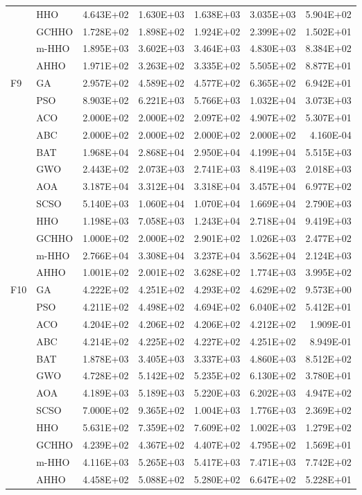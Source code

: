 \begin{longtable}{llrrrrr}
 & HHO & 4.643E+02 & 1.630E+03 & 1.638E+03 & 3.035E+03 & 5.904E+02 \\
 & GCHHO & 1.728E+02 & 1.898E+02 & 1.924E+02 & 2.399E+02 & 1.502E+01 \\
 & m-HHO & 1.895E+03 & 3.602E+03 & 3.464E+03 & 4.830E+03 & 8.384E+02 \\
 & AHHO & 1.971E+02 & 3.263E+02 & 3.335E+02 & 5.505E+02 & 8.877E+01 \\
\addlinespace
F9 & GA & 2.957E+02 & 4.589E+02 & 4.577E+02 & 6.365E+02 & 6.942E+01 \\
 & PSO & 8.903E+02 & 6.221E+03 & 5.766E+03 & 1.032E+04 & 3.073E+03 \\
 & ACO & 2.000E+02 & 2.000E+02 & 2.097E+02 & 4.907E+02 & 5.307E+01 \\
 & ABC & 2.000E+02 & 2.000E+02 & 2.000E+02 & 2.000E+02 & 4.160E-04 \\
 & BAT & 1.968E+04 & 2.868E+04 & 2.950E+04 & 4.199E+04 & 5.515E+03 \\
 & GWO & 2.443E+02 & 2.073E+03 & 2.741E+03 & 8.419E+03 & 2.018E+03 \\
 & AOA & 3.187E+04 & 3.312E+04 & 3.318E+04 & 3.457E+04 & 6.977E+02 \\
 & SCSO & 5.140E+03 & 1.060E+04 & 1.070E+04 & 1.669E+04 & 2.790E+03 \\
 & HHO & 1.198E+03 & 7.058E+03 & 1.243E+04 & 2.718E+04 & 9.419E+03 \\
 & GCHHO & 1.000E+02 & 2.000E+02 & 2.901E+02 & 1.026E+03 & 2.477E+02 \\
 & m-HHO & 2.766E+04 & 3.308E+04 & 3.237E+04 & 3.562E+04 & 2.124E+03 \\
 & AHHO & 1.001E+02 & 2.001E+02 & 3.628E+02 & 1.774E+03 & 3.995E+02 \\
\addlinespace
F10 & GA & 4.222E+02 & 4.251E+02 & 4.293E+02 & 4.629E+02 & 9.573E+00 \\
 & PSO & 4.211E+02 & 4.498E+02 & 4.694E+02 & 6.040E+02 & 5.412E+01 \\
 & ACO & 4.204E+02 & 4.206E+02 & 4.206E+02 & 4.212E+02 & 1.909E-01 \\
 & ABC & 4.214E+02 & 4.225E+02 & 4.227E+02 & 4.251E+02 & 8.949E-01 \\
 & BAT & 1.878E+03 & 3.405E+03 & 3.337E+03 & 4.860E+03 & 8.512E+02 \\
 & GWO & 4.728E+02 & 5.142E+02 & 5.235E+02 & 6.130E+02 & 3.780E+01 \\
 & AOA & 4.189E+03 & 5.189E+03 & 5.220E+03 & 6.202E+03 & 4.947E+02 \\
 & SCSO & 7.000E+02 & 9.365E+02 & 1.004E+03 & 1.776E+03 & 2.369E+02 \\
 & HHO & 5.631E+02 & 7.359E+02 & 7.609E+02 & 1.002E+03 & 1.279E+02 \\
 & GCHHO & 4.239E+02 & 4.367E+02 & 4.407E+02 & 4.795E+02 & 1.569E+01 \\
 & m-HHO & 4.116E+03 & 5.265E+03 & 5.417E+03 & 7.471E+03 & 7.742E+02 \\
 & AHHO & 4.458E+02 & 5.088E+02 & 5.280E+02 & 6.647E+02 & 5.228E+01 \\
\end{longtable}
